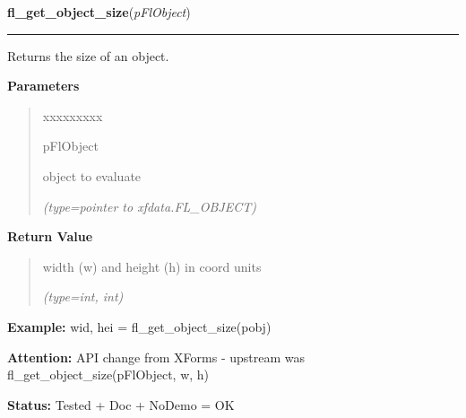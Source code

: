 \hspace{.8\funcindent}\begin{boxedminipage}{\funcwidth}

    \raggedright \textbf{fl\_get\_object\_size}(\textit{pFlObject})

    \vspace{-1.5ex}

    \rule{\textwidth}{0.5\fboxrule}
\setlength{\parskip}{2ex}
    Returns the size of an object.

\setlength{\parskip}{1ex}
      \textbf{Parameters}
      \vspace{-1ex}

      \begin{quote}
        \begin{Ventry}{xxxxxxxxx}

          \item[pFlObject]

          object to evaluate

            {\it (type=pointer to xfdata.FL\_OBJECT)}

        \end{Ventry}

      \end{quote}

      \textbf{Return Value}
    \vspace{-1ex}

      \begin{quote}
      width (w) and height (h) in coord units

      {\it (type=int, int)}

      \end{quote}

\textbf{Example:} wid, hei = fl\_get\_object\_size(pobj)



\textbf{Attention:} API change from XForms - upstream was fl\_get\_object\_size(pFlObject, w, 
h)



\textbf{Status:} Tested + Doc + NoDemo = OK



    \end{boxedminipage}

    \label{xformslib:flbasic:fl_set_object_size}

    \vspace{0.5ex}


